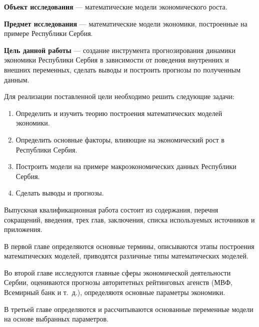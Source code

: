 \textbf{Объект исследования} --- математические модели экономического роста.

\textbf{Предмет исследования} --- математические модели экономики, построенные на примере Республики Сербия.

\textbf{Цель данной работы} --- создание инструмента прогнозирования динамики экономики Республики Сербия в зависимости от поведения внутренних и внешних переменных, сделать выводы и построить прогнозы по полученным данным.

Для реализации поставленной цели необходимо решить следующие задачи:
\begin{enumerate}
	\item Определить и изучить теорию построения математических моделей экономики.
	\item Определить основные факторы, влияющие на экономический рост в Республики Сербия.
	\item Построить модели на примере макроэкономических данных Республики Сербия.
	\item Сделать выводы и прогнозы.
\end{enumerate}

Выпускная квалификационная работа состоит из содержания, перечня сокращений, введения, трех глав, заключения, списка используемых источников и приложения.

В первой главе определяются основные термины, описываются этапы построения математических моделей, приводятся различные типы математических моделей.

Во второй главе исследуются главные сферы экономической деятельности Сербии, оцениваются прогнозы авторитетных рейтинговых агенств (МВФ, Всемирный банк и т.~д.), определяютя основные параметры экономики.

В третьей главе определяются и рассчитываются основанные переменные модели на основе выбранных параметров.

